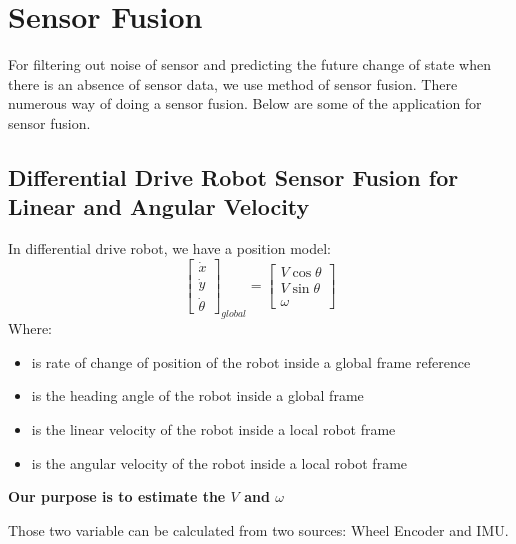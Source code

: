 \chapter{Sensor Fusion}
For filtering out noise of sensor and predicting the future change of state when there is an absence of sensor data, we use method of sensor fusion. There numerous way of doing a sensor fusion. Below are some of the application for sensor fusion. 

\section{Differential Drive Robot Sensor Fusion for Linear and Angular Velocity}
	In differential drive robot, we have a position model:
	\begin{equation}
		\begin{bmatrix}
			\dot{x}      \\
			\dot{y}      \\
			\dot{\theta} 
		\end{bmatrix}_{global}=
		\begin{bmatrix}
			V \cos \theta \\
			V \sin \theta \\
			\omega        
		\end{bmatrix}
		\label{sensorfuseq1}
	\end{equation}
	Where:
	\begin{itemize}
		\item { is rate of change of position of the robot inside a global frame reference}
		\item {\makebox[2cm]{\(\theta\)\hfill} is the heading angle of the robot inside a global frame}
		\item { is the linear velocity of the robot inside a local robot frame}
		\item {\makebox[2cm]{\(\omega\)\hfill} is the angular velocity of the robot inside a local robot frame}
	\end{itemize}
	\begin{center}
		\textbf{Our purpose is to estimate the \(V\) and \(\omega\)}
	\end{center}
	Those two variable can be calculated from two sources: Wheel Encoder and IMU.\\

